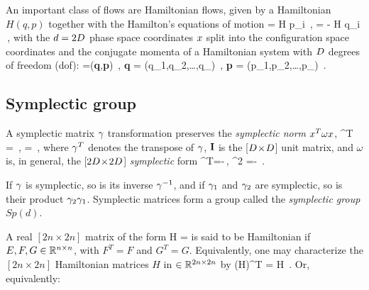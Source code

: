 An important class of flows are Hamiltonian flows,
given by a
Hamiltonian $H(q,p)$ together with the Hamilton's
equations of motion
\beq
{} = {\partial H \over \partial p_i}
    \,, \quad\quad  %
 = - {\partial H \over \partial q_i}
\,,
with the $d= 2D$ phase space coordinates $x$ split into
the configuration space coordinates and the
conjugate momenta of a Hamiltonian system with $D$ degrees of freedom
(dof):
\beq
\pSpace=({\bf q},{\bf p})
\,,\qquad
{\bf q} = (q_1,q_2,\dots,q_\DOF)
\,,\qquad
{\bf p} = (p_1,p_2,\dots,p_\DOF)
\,.

\subsection{Symplectic group}
\label{sect:SymplctGroup}

A symplectic matrix $\gamma$ transformation preserves the
\emph{symplectic norm} $x^T {\bf \omega} x$,
\beq
\LieEl^T {\bf \omega} \LieEl = {\bf \omega}
    \,, \quad\quad
{\omega} = 
	\,,
where
$\gamma^T$ denotes the transpose of $\gamma$, ${\bf I}$ is the
[$D\!\times\!D$] unit matrix, and ${\omega}$ is, in general, the
[$2D\!\times\!2D$] {\em symplectic} form
\beq
{\bf \omega}^T=-{\bf \omega}\,,
\qquad {\bf \omega}^2 =- \matId
\,.


If $\gamma$ is symplectic,
so is its inverse $\gamma^{-1}$, and if $\gamma_1$ and $\gamma_2$ are
symplectic, so is their product $\gamma_2 \gamma_1$. Symplectic matrices
form a group called the \emph{symplectic group} $Sp(d)$.

A real $[\!2n\times\!2n]$ matrix of the form
\beq
H = 
is said to be Hamiltonian if $E, F, G \in \mathbb{R}^{n \times n}$,
 with $F^T = F$ and $G^T = G$. Equivalently, one
may characterize the $[\!2n\times\!2n]$  Hamiltonian matrices $H$
in $\in \mathbb{R}^{2n \times 2n}$ by
\beq
({\bf \omega}H)^T = {\bf \omega}H
\,.
Or, equivalently:

